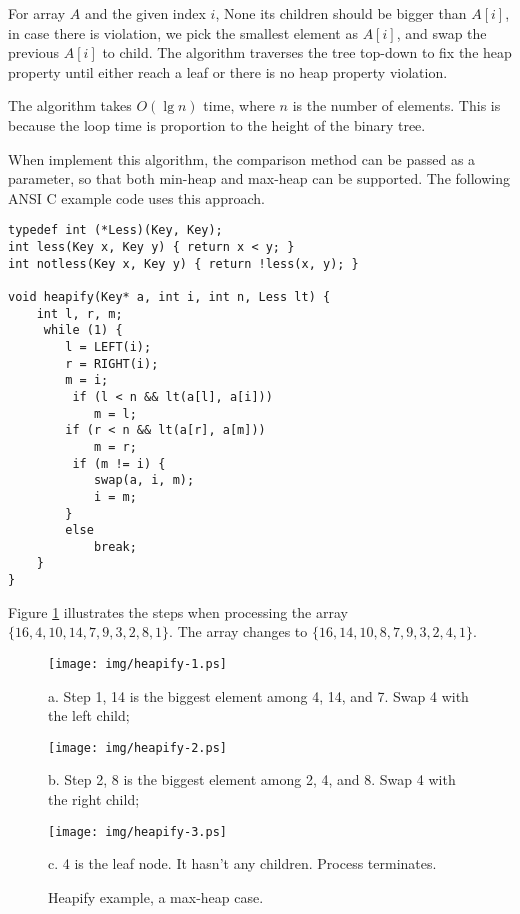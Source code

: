\documentclass{article}
\begin{document}
For array $A$ and the given index $i$, None its children
should be bigger than $A[i]$, in case there is violation, we pick the smallest
element as $A[i]$, and swap the previous $A[i]$ to child.
The algorithm traverses the tree top-down to fix the heap property
until either reach a leaf or there is no heap property violation.

The  algorithm takes $O(\lg n)$ time, where
$n$ is the number of elements. This
is because the loop time is proportion to the height of the binary tree.

When implement this algorithm, the comparison method can be passed as
a parameter, so that both min-heap and max-heap can be supported.
The following ANSI C example code uses this approach.

\begin{lstlisting}
typedef int (*Less)(Key, Key);
int less(Key x, Key y) { return x < y; }
int notless(Key x, Key y) { return !less(x, y); }

void heapify(Key* a, int i, int n, Less lt) {
    int l, r, m;
     while (1) {
        l = LEFT(i);
        r = RIGHT(i);
        m = i;
         if (l < n && lt(a[l], a[i]))
            m = l;
        if (r < n && lt(a[r], a[m]))
            m = r;
         if (m != i) {
            swap(a, i, m);
            i = m;
        }
        else
            break;
    }
}
\end{lstlisting}

Figure \ref{fig:heapify} illustrates the steps when  processing the
array $\{16, 4, 10, 14, 7, 9, 3, 2, 8, 1\}$. The array changes to
$\{16, 14, 10, 8, 7, 9, 3, 2, 4, 1\}$.

\begin{figure}[htbp]
  \begin{center}
    \texttt{[image: img/heapify-1.ps]}

    a. Step 1, 14 is the biggest element among 4, 14, and 7. Swap 4 with the left child;

    \texttt{[image: img/heapify-2.ps]}

    b. Step 2, 8 is the biggest element among 2, 4, and 8. Swap 4 with the right child;

    \texttt{[image: img/heapify-3.ps]}

    c. 4 is the leaf node. It hasn't any children. Process terminates.
    \caption{Heapify example, a max-heap case.} \label{fig:heapify}
  \end{center}
\end{figure}
\end{document}
